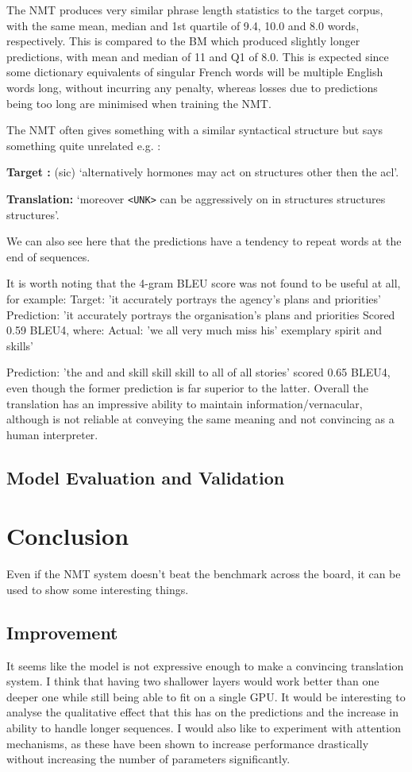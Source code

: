 \documentclass[]{article}
\begin{document}
The NMT produces very similar phrase length statistics to the target corpus, with the same mean, median and 1st quartile of 9.4, 10.0 and 8.0 words, respectively. This is compared to the BM which produced slightly longer predictions, with mean and median of 11 and Q1 of 8.0. This is expected since some dictionary equivalents of singular French words will be multiple English words long, without incurring any penalty, whereas losses due to predictions being too long are minimised when training the NMT.

The NMT often gives something with a similar syntactical structure but says something quite unrelated e.g. :

\textbf{Target :} (sic) `alternatively hormones may act on structures other then the acl'.
	
\textbf{Translation:} `moreover \lstinline{<UNK>} can be aggressively on in structures structures structures'.

We can also see here that the predictions have a tendency to repeat words at the end of sequences.

It is worth noting that the 4-gram BLEU score was not found to be useful at all, for example: 
Target: 'it accurately portrays the agency's plans and priorities'
Prediction: 'it accurately portrays the organisation's plans and priorities
Scored 0.59 BLEU4, where:
Actual: 'we all very much miss his' exemplary spirit and skills'

Prediction: 'the and and skill skill skill to all of all stories'
scored 0.65 BLEU4, even though the former prediction is far superior to the latter.
Overall the translation has an impressive ability to maintain information/vernacular, although is not reliable at conveying the same meaning and not convincing as a human interpreter.
\subsection{Model Evaluation and Validation}

\section{Conclusion}
Even if the NMT system doesn't beat the benchmark across the board, it can be used to show some interesting things.


\subsection{Improvement}
It seems like the model is not expressive enough to make a convincing translation system. I think that having two shallower layers would work better than one deeper one while still being able to fit on a single GPU. It would be interesting to analyse the qualitative effect that this has on the predictions and the increase in ability to handle longer sequences. I would also like to experiment with attention mechanisms, as these have been shown to increase performance drastically without increasing the number of parameters significantly.
\end{document}
